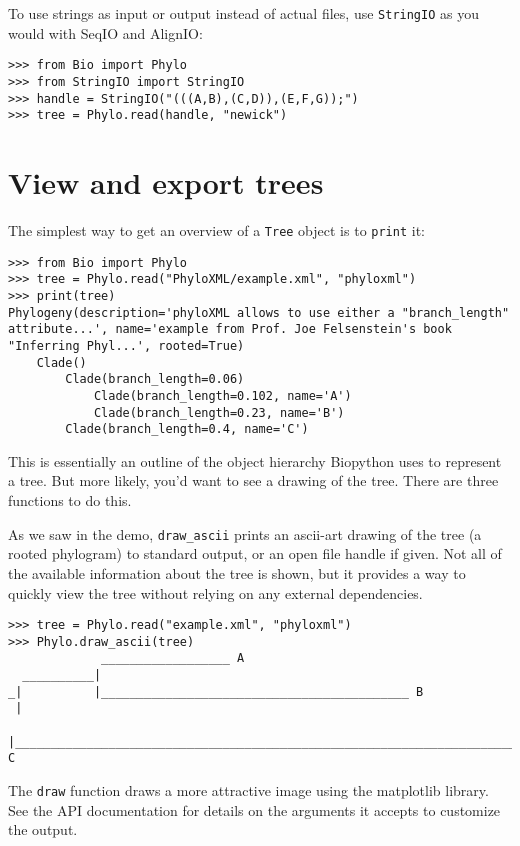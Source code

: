 \documentclass{report}
\begin{document}
To use strings as input or output instead of actual files, use \verb|StringIO| as you would
with SeqIO and AlignIO:

\begin{verbatim}
>>> from Bio import Phylo
>>> from StringIO import StringIO
>>> handle = StringIO("(((A,B),(C,D)),(E,F,G));")
>>> tree = Phylo.read(handle, "newick")
\end{verbatim}


\section{View and export trees}

The simplest way to get an overview of a \verb|Tree| object is to \verb|print| it:

\begin{verbatim}
>>> from Bio import Phylo
>>> tree = Phylo.read("PhyloXML/example.xml", "phyloxml")
>>> print(tree)
Phylogeny(description='phyloXML allows to use either a "branch_length" attribute...', name='example from Prof. Joe Felsenstein's book "Inferring Phyl...', rooted=True)
    Clade()
        Clade(branch_length=0.06)
            Clade(branch_length=0.102, name='A')
            Clade(branch_length=0.23, name='B')
        Clade(branch_length=0.4, name='C')
\end{verbatim}

This is essentially an outline of the object hierarchy Biopython uses to represent a tree. But
more likely, you'd want to see a drawing of the tree. There are three functions to do this.

As we saw in the demo, \verb|draw_ascii| prints an ascii-art drawing of the tree (a
rooted phylogram) to standard output, or an open file handle if given. Not all of the
available information about the tree is shown, but it provides a way to quickly view the
tree without relying on any external dependencies.

\begin{verbatim}
>>> tree = Phylo.read("example.xml", "phyloxml")
>>> Phylo.draw_ascii(tree)
             __________________ A
  __________|
_|          |___________________________________________ B
 |
 |___________________________________________________________________________ C

\end{verbatim}

The \verb|draw| function draws a more attractive image using the matplotlib
library. See the API documentation for details on the arguments it accepts to
customize the output.
\end{document}
